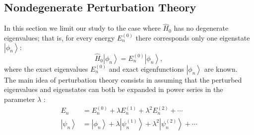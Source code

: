 \subsection{Nondegenerate Perturbation Theory}
In this section we limit our study to the case where $\hat{H}_{0}$ has no degenerate eigenvalues; that is, for every energy $E_{n}^{(0)}$ there corresponds only one eigenstate $\left|\phi_{n}\right\rangle:$
$$
\hat{H}_{0}\left|\phi_{n}\right\rangle=E_{n}^{(0)}\left|\phi_{n}\right\rangle,
$$
where the exact eigenvalues $E_{n}^{(0)}$ and exact eigenfunctions $\left|\phi_{n}\right\rangle$ are known.\\

The main idea of perturbation theory consists in assuming that the perturbed eigenvalues and eigenstates can both be expanded in power series in the parameter $\lambda$ :
$$
\begin{aligned}
E_{n} &=E_{n}^{(0)}+\lambda E_{n}^{(1)}+\lambda^{2} E_{n}^{(2)}+\cdots \\
\left|\psi_{n}\right\rangle &=\left|\phi_{n}\right\rangle+\lambda\left|\psi_{n}^{(1)}\right\rangle+\lambda^{2}\left|\psi_{n}^{(2)}\right\rangle+\cdots
\end{aligned}
$$

